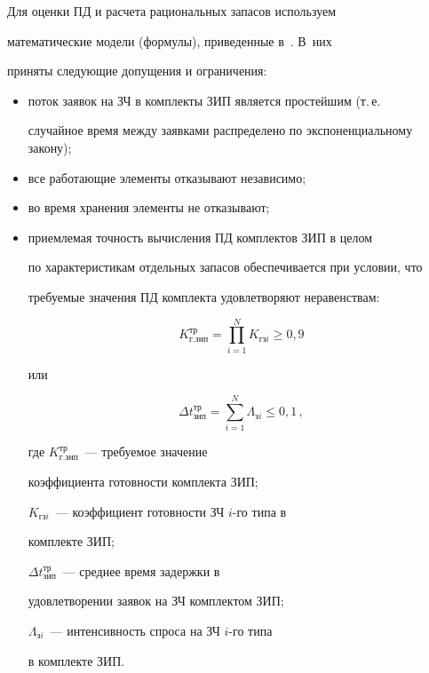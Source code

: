      


    


    Для оценки ПД и расчета рациональных запасов используем 


математические модели (формулы), приведенные в~\cite{5-koz}. В~них 


приняты следующие допущения и ограничения:


    \begin{itemize}


    \item поток заявок на ЗЧ в комплекты ЗИП является простейшим (т.\,е.\ 


случайное время между заявками распределено по экспоненциальному закону);


    \item все работающие элементы отказывают независимо;


    \item во время хранения элементы не отказывают;


    \item приемлемая точность вычисления ПД комплектов ЗИП в целом 


по характеристикам отдельных запасов обеспечивается при условии, что 


требуемые значения ПД комплекта удовлетворяют неравенствам:


    \begin{equation}


K_{\mathrm{г.зип}}^{\mathrm{тр}}=\prod\limits_{i=1}^N K_{\mathrm{гз}i}\geq 


0{,}9


\label{e3-koz}


\end{equation}


или


\begin{equation}


\Delta t^{\mathrm{тр}}_{\mathrm{зип}}=\sum\limits_{i=1}^N 


\Lambda_{\mathrm{з}i}\leq 0{,}1\,,


\label{e4-koz}


\end{equation}


где $K^{\mathrm{тр}}_{\mathrm{г.зип}}$~--- требуемое значение 


коэффициента готовности комплекта ЗИП;


$K_{\mathrm{гз}i}$~--- коэффициент готовности ЗЧ $i$-го типа в 


комплекте ЗИП;


$\Delta t^{\mathrm{тр}}_{\mathrm{зип}}$~--- среднее время задержки в 


удовлетворении заявок на ЗЧ комплектом ЗИП;


$\Lambda_{\mathrm{з}i}$~--- интенсивность спроса на ЗЧ $i$-го типа 


в комплекте ЗИП.


\end{itemize}








